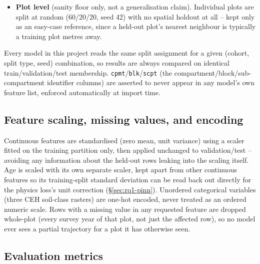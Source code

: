 \documentclass[11pt,a4paper]{report}
\begin{document}
\begin{itemize}
  never saw, a different and harder question than spatial generalisation. A narrow-gap variant
  (training years closer to the test year) is also defined for a secondary check; its validation
  year is deliberately the earliest available year, not a middle year, because holding out a
  middle year left the PINN's trajectory-pair loss with no pairable plots in one smoke test.
\item \textbf{Plot level} (sanity floor only, not a generalisation claim). Individual plots are
  split at random (60/20/20, seed 42) with no spatial holdout at all -- kept only as an easy-case
  reference, since a held-out plot's nearest neighbour is typically a training plot metres away.
\end{itemize}

Every model in this project reads the same split assignment for a given (cohort, split type,
seed) combination, so results are always compared on identical train/validation/test membership.
\texttt{cpmt}/\texttt{blk}/\texttt{scpt} (the compartment/block/sub-compartment identifier
columns) are asserted to never appear in any model's own feature list, enforced automatically at
import time.

\subsection{Feature scaling, missing values, and encoding}

Continuous features are standardised (zero mean, unit variance) using a scaler fitted on the
training partition only, then applied unchanged to validation/test -- avoiding any information
about the held-out rows leaking into the scaling itself. Age is scaled with its own separate
scaler, kept apart from other continuous features so its training-split standard deviation can be
read back out directly for the physics loss's unit correction (\S\ref{sec:rq1-pinn}). Unordered
categorical variables (three CEH soil-class rasters) are one-hot encoded, never treated as an
ordered numeric scale. Rows with a missing value in any requested feature are dropped whole-plot
(every survey year of that plot, not just the affected row), so no model ever sees a partial
trajectory for a plot it has otherwise seen.

\subsection{Evaluation metrics}
\label{sec:metrics}
\end{document}
